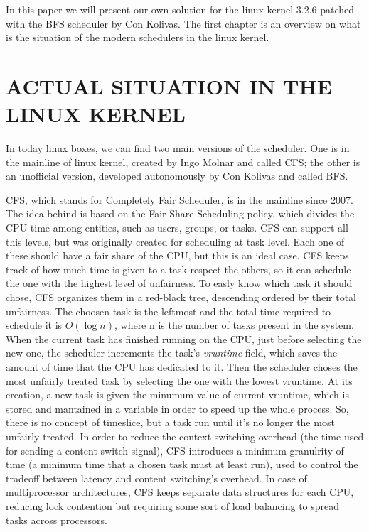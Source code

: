 \documentclass[journal]{IEEEtran}
\begin{document}
In this paper we will present our own solution for the linux kernel
3.2.6 patched with the BFS scheduler by Con Kolivas. The first chapter
is an overview on what is the situation of the modern schedulers in
the linux kernel.


\section{ACTUAL SITUATION IN THE LINUX KERNEL}

In today linux boxes, we can find two main versions of the scheduler.
One is in the mainline of linux kernel, created by Ingo Molnar and
called CFS; the other is an unofficial version, developed autonomously
by Con Kolivas and called BFS.\medskip{}


CFS, which stands for Completely Fair Scheduler, is in the mainline
since 2007. The idea behind is based on the Fair-Share Scheduling
policy, which divides the CPU time among entities, such as users,
groups, or tasks. CFS can support all this levels, but was originally
created for scheduling at task level. Each one of these should have
a fair share of the CPU, but this is an ideal case. CFS keeps track
of how much time is given to a task respect the others, so it can
schedule the one with the highest level of unfairness. To easly know
which task it should chose, CFS organizes them in a red-black tree,
descending ordered by their total unfairness. The choosen task is
the leftmost and the total time required to schedule it is $O\left(\log n\right)$,
where n is the number of tasks present in the system. When the current
task has finished running on the CPU, just before selecting the new
one, the scheduler increments the task's \textit{vruntime} field,
which saves the amount of time that the CPU has dedicated to it. Then
the scheduler choses the most unfairly treated task by selecting the
one with the lowest vruntime. At its creation, a new task is given
the minumum value of current vruntime, which is stored and mantained
in a variable in order to speed up the whole process. So, there is
no concept of timeslice, but a task run until it's no longer the most
unfairly treated. In order to reduce the context switching overhead
(the time used for sending a content switch signal), CFS introduces
a minimum granulrity of time (a minimum time that a chosen task must
at least run), used to control the tradeoff between latency and content
switching's overhead. In case of multiprocessor architectures, CFS
keeps separate data structures for each CPU, reducing lock contention
but requiring some sort of load balancing to spread tasks across processors.
\end{document}
